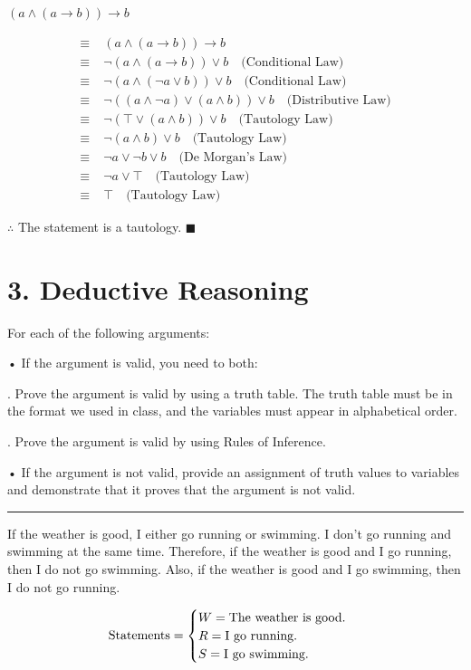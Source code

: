 \documentclass[]{article}
\begin{document}
\begin{question}
    $(a \land (a \rightarrow b)) \rightarrow b$
\end{question}
\begin{align*}
    \equiv\; & (a \land (a \rightarrow b)) \rightarrow b \\
    \equiv\; & \neg(a \land (a \rightarrow b)) \lor b \quad \text{(Conditional Law)} \\
    \equiv\; & \neg(a \land (\neg a \lor b)) \lor b \quad \text{(Conditional Law)} \\
    \equiv\; & \neg((a \land \neg a) \lor (a \land b)) \lor b \quad \text{(Distributive Law)} \\
    \equiv\; & \neg(\top \lor (a\land b)) \lor b \quad \text{(Tautology Law)}\\
    \equiv\; &  \neg(a \land b) \lor b \quad \text{(Tautology Law)} \\
    \equiv\; & \neg a \lor \neg b \lor b \quad \text{(De Morgan's Law)} \\
    \equiv\; & \neg a \lor \top \quad \text{(Tautology Law)} \\
    \equiv\; & \top \quad \text{(Tautology Law)}
\end{align*}
\begin{center}
    $\therefore$ The statement is a tautology. $\blacksquare$
\end{center}
\section*{3. Deductive Reasoning}
For each of the following arguments:

\quad • If the argument is valid, you need to both:

\quad {}. Prove the argument is valid by using a truth table. The truth table must be in the format we used in class, and the variables must appear in alphabetical order.

\quad {}. Prove the argument is valid by using Rules of Inference.



\quad • If the argument is not valid, provide an assignment of truth values to variables and demonstrate that it proves
that the argument is not valid.
\vspace{0.1in}
\hrule
\vspace{0.1in}

\begin{question}
    If the weather is good, I either go running or swimming. I don’t go running and swimming at the same time.
Therefore, if the weather is good and I go running, then I do not go swimming. Also, if the weather is good and
I go swimming, then I do not go running.
\end{question}
\[
    \text{Statements} = \begin{cases}
        W = \text{The weather is good.} \\
        R = \text{I go running.} \\
        S = \text{I go swimming.}
    \end{cases} \\
\]
    
\end{document}
